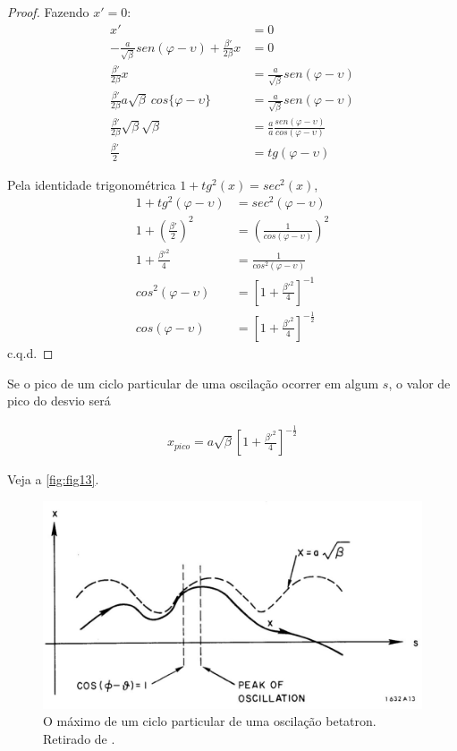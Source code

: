 \begin{proof}
	Fazendo $x'=0$:
	\begin{align*}
        x'&=0\\
        -\frac{a}{\sqrt{\beta}}sen(\varphi-\upsilon)+\frac{\beta'}{2\beta}x &= 0\\
        \frac{\beta'}{2\beta}x &= \frac{a}{\sqrt{\beta}}sen(\varphi-\upsilon)\\
        \frac{\beta'}{2\beta}a\sqrt{\beta}\ cos\{\varphi-\upsilon\} &= \frac{a}{\sqrt{\beta}}sen(\varphi-\upsilon)\\
        \frac{\beta'}{2\beta}\sqrt{\beta}\sqrt{\beta} &= \frac{a}{a}\frac{sen(\varphi-\upsilon)}{cos(\varphi-\upsilon)}\\
        \frac{\beta'}{2} &= tg(\varphi-\upsilon)
	\end{align*}
	
	Pela identidade trigonométrica $1+tg^2(x) = sec^2(x)$,
	\begin{align*}
        1+tg^2(\varphi-\upsilon) &= sec^2(\varphi-\upsilon)\\
        1+\left(\frac{\beta'}{2}\right)^2 &= \left(\frac{1}{cos(\varphi-\upsilon)}\right)^2\\
        1+\frac{\beta'^2}{4} &= \frac{1}{cos^2(\varphi-\upsilon)}\\
        cos^2(\varphi-\upsilon) &= \left[1+\frac{\beta'^2}{4}\right]^{-1}\\
        cos(\varphi-\upsilon) &= \left[1+\frac{\beta'^2}{4}\right]^{-\frac{1}{2}}
	\end{align*}
	c.q.d.
\end{proof}
	
Se o pico de um ciclo particular de uma oscilação ocorrer em algum $s$, o valor de pico do desvio será
	
\begin{align}
	x_{pico} = a\sqrt{\beta}\left[1+\frac{\beta'^2}{4}\right]^{-\frac{1}{2}}
\end{align}

Veja a \autoref{fig:fig13}.

\begin{figure}[!htb]
	\centering
	\includegraphics[width=0.8\linewidth]{./Figuras/fig13.jpeg}
	\caption{O máximo de um ciclo particular de uma oscilação betatron. Retirado de \cite{sands1970physics}.}
	\label{fig:fig13}
\end{figure}
	
